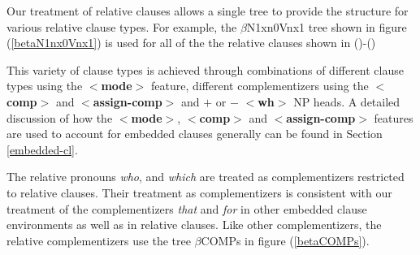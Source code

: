 \begin{figure}[htbp]
\end{figure}




Our treatment of relative clauses allows a single tree to provide the
structure for various relative clause types. For example, the
$\beta$N1xn0Vnx1 tree shown in figure (\ref{betaN1nx0Vnx1}) is used
for all of the the relative clauses shown in ()-()
\vspace{0.5cm}


This variety of clause types is achieved through combinations of
different clause types using the {\bf $<$mode$>$} feature, different
complementizers using the {\bf $<$comp$>$} and {\bf $<$assign-comp$>$}
and {\bf $+$} or {\bf $-$} {\bf $<$wh$>$} NP heads. A detailed
discussion of how the {\bf $<$mode$>$}, {\bf $<$comp$>$} and {\bf
$<$assign-comp$>$} features are used to account for embedded clauses
generally can be found in Section
\ref{embedded-cl}.  

The relative pronouns {\it who}, and {\it which} are treated as
complementizers restricted to relative clauses.  Their treatment as
complementizers is consistent with our treatment of the
complementizers {\it that} and {\it for} in other embedded clause
environments as well as in relative clauses. Like other
complementizers, the relative complementizers use the tree
$\beta$COMPs in figure (\ref{betaCOMPs}).


\begin{figure}[htbp]
\end{figure}

